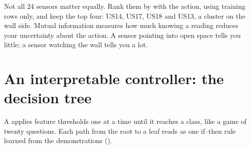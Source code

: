 Not all 24 sensors matter equally. Rank them by  with the action, using training rows only, and keep the top four: US14, US17, US18 and US13, a cluster on the wall side. Mutual information measures how much knowing a reading reduces your uncertainty about the action. A sensor pointing into open space tells you little; a sensor watching the wall tells you a lot.

\section{An interpretable controller: the decision tree}

A  applies feature thresholds one at a time until it reaches a class, like a game of twenty questions. Each path from the root to a leaf reads as one if--then rule learned from the demonstrations ().

